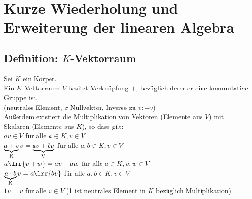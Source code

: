 \chapter{Kurze Wiederholung und Erweiterung der linearen Algebra}

\section{Definition: $K$-Vektorraum}
	Sei $K$ ein Körper.\\
	Ein $K$-Vektorraum $V$ besitzt Verknüpfung $+$, bezüglich derer er eine kommutative Gruppe ist.\\
	(neutrales Element, $\sigma$ Nullvektor, Inverse zu $v:-v$)\\
	Außerdem existiert die Multiplikation von Vektoren (Elemente aus $V$) mit Skalaren (Elemente aus $K$), so dass gilt:\\
	$av\in V$ für alle $a\in K, v\in V$\\
	$\underbrace{a+b}_{\mbox{\scriptsize K}}v=\underbrace{av+bv}_{\mbox{\scriptsize V}}$ für alle $a,b\in K, v\in V$\\
	$a\lrr{v+w}=av+aw$ für alle $a\in K,v,w\in V$\\
	$\underbrace{a\cdot b}_{\mbox{\scriptsize K}}v=a\lrr{bv}$ für alle $a,b\in K, v\in V$\\
	$1v=v$ für alle $v\in V$ (1 ist neutrales Element in $K$ bezüglich Multiplikation)

